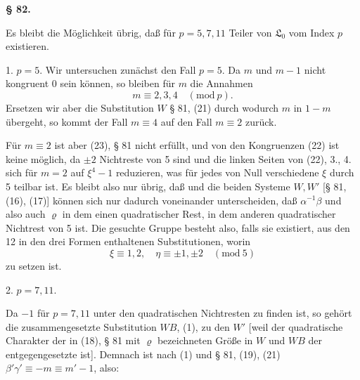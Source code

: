 
\begin{center}
\textbf{§ 82. }
\end{center}

Es bleibt die Möglichkeit übrig, daß für $p = 5, 7, 11$ Teiler von $\mathfrak{L}_0$ vom Index $p$ existieren.

1. $p = 5$. Wir untersuchen zunächst den Fall $p = 5$. Da $m$ und $m - 1$ nicht kongruent 0 sein können, so bleiben für $m$ die Annahmen
\[
m \equiv 2, 3, 4 \quad (\mathrm{mod}\ p).
\]
Ersetzen wir aber die Substitution $W$ § 81, (21) durch
wodurch $m$ in $1 - m$ übergeht, so kommt der Fall $m \equiv 4$ auf den Fall $m \equiv 2$ zurück.

Für $m \equiv 2$ ist aber (23), § 81 nicht erfüllt, und von den Kongruenzen (22) ist keine möglich, da $\pm 2$ Nichtreste von 5 sind und die linken Seiten von (22), 3., 4. sich für $m = 2$ auf $\xi^4 - 1$ reduzieren, was für jedes von Null verschiedene $\xi$ durch 5 teilbar ist. Es bleibt also nur übrig, daß
und die beiden Systeme $W, W'$ [§ 81, (16), (17)] können sich nur dadurch voneinander unterscheiden, daß $\alpha^{-1}\beta$ und also auch $\varrho$ in dem einen quadratischer Rest, in dem anderen quadratischer Nichtrest von 5 ist. Die gesuchte Gruppe besteht also, falls sie existiert, aus den 12 in den drei Formen
enthaltenen Substitutionen, worin
\[
\xi \equiv 1, 2, \quad \eta \equiv \pm 1, \pm 2 \quad (\mathrm{mod}\ 5)
\]
zu setzen ist.

2. $p = 7, 11$.

Da $-1$ für $p = 7, 11$ unter den quadratischen Nichtresten zu finden ist, so gehört die zusammengesetzte Substitution $WB$, (1), zu den $W'$ [weil der quadratische Charakter der in (18), § 81 mit $\varrho$ bezeichneten Größe in $W$ und $WB$ der entgegengesetzte ist]. Demnach ist nach (1) und § 81, (19), (21) $\beta'\gamma' \equiv -m \equiv m' - 1$, also:
